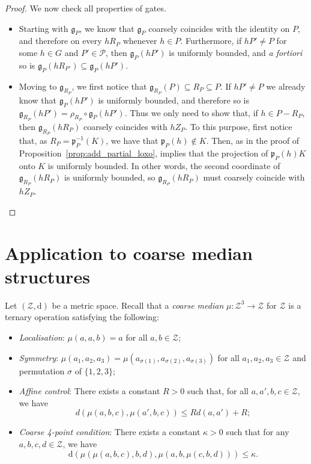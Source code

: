 \documentclass[svgnames]{amsart}
\theoremstyle{plain}
\theoremstyle{definition}
\newcommand{\dist}{\mathrm{d}}
\newcommand{\cuco}[1]{{\mathcal #1}}
\newcommand{\gate}{\mathfrak{g}}
\newcommand{\p}{\mathfrak{p}}
\begin{document}
\begin{proof}
We now check all properties of gates.
\begin{itemize}
    \item Starting with $\gate_P$, we know that $\gate_P$ coarsely coincides with the identity on $P$, and therefore on every $h{R_P}$ whenever $h\in P$. Furthermore, if $hP'\neq P$ for some $h\in G$ and $P'\in \mathcal P$, then $\gate_P(hP')$ is uniformly bounded, and \emph{a fortiori} so is $\gate_P(h{R_{P'}})\subseteq \gate_P(hP')$.
    \item Moving to $\gate_{R_P}$, we first notice that $\gate_{R_P}(P)\subseteq {R_P}\subseteq P$. If $hP'\neq P$ we already know that $\gate_P(hP')$ is uniformly bounded, and therefore so is $\gate_{R_P}(hP')=\rho_{R_P}\circ \gate_P(hP')$. Thus we only need to show that, if $h\in P-{R_P}$, then $\gate_{R_P}(h{R_P})$ coarsely coincides with $hZ_P$. To this purpose, first notice that, as ${R_P}=\p_P^{-1}(K)$, we have that $\p_P(h)\not \in K$. Then, as in the proof of Proposition~\ref{prop:add_partial_loxo}, \cite[Lemma 6.7]{DGO} implies that the projection of $\p_P(h) K$ onto $K$ is uniformly bounded. In other words, the second coordinate of $\gate_{R_P}(h{R_P})$ is uniformly bounded, so $\gate_{R_P}(h{R_P})$ must coarsely coincide with $hZ_P$.\qedhere
\end{itemize}
\end{proof}









\section{Application to coarse median structures}\label{sec:mcg_coarsemedian}
Let $(\cuco Z,\dist)$ be a metric space. Recall that a \emph{coarse median} $\mu\colon \cuco Z^3\to \cuco Z$ for $\cuco Z$ is a ternary operation satisfying the following:
\begin{itemize}
  \item \emph{Localisation}: $\mu(a,a,b)=a$ for all $a,b\in \cuco Z$;
  \item \emph{Symmetry}: $\mu(a_1,a_2,a_3)=\mu( a_{\sigma(1)},a_{\sigma(2)},a_{\sigma(3)})$ for all $a_1,a_2,a_3\in \cuco Z$ and permutation $\sigma$ of $\{1,2,3\}$;
 \item \emph{Affine control}: There exists a constant $R>0$ such that, for all $a,a',b,c\in \cuco Z$, we have
      $$d(\mu(a,b,c), \mu(a',b,c)) \leqslant Rd(a,a')+R;$$
  \item \emph{Coarse 4-point condition}: There exists a constant $\kappa>0$ such that for any $a,b,c,d\in \cuco Z$, we have
$$
\dist\left(\mu\left(\mu(a,b,c),b,d\right), \mu\left(a,b, \mu(c,b,d)\right)\right)\le \kappa.
$$
 \end{itemize}
\end{document}
